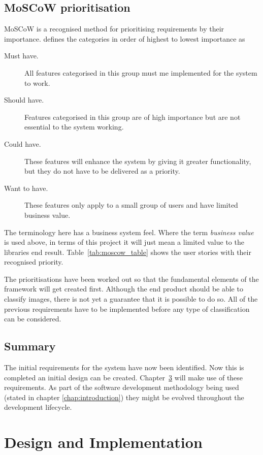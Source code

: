 \documentclass[11pt,oneside]{report}
\begin{document}
		\section{MoSCoW prioritisation}
			MoSCoW is a recognised method for prioritising requirements by their importance.  defines the categories in order of highest to lowest importance as
			\begin{description}
				\item[Must have. ] All features categorised in this group must me implemented for the system to work.
				\item[Should have. ] Features categorised in this group are of high importance but are not essential to the system working.
				\item[Could have. ] These features will enhance the system by giving it greater functionality, but they do not have to be delivered as a priority.
				\item[Want to have. ] These features only apply to a small group of users and have limited business value.
			\end{description}
			The terminology here has a business system feel.
			Where the term \textit{business value} is used above, in terms of this project it will just mean a limited value to the libraries end result.
			Table~\ref{tab:moscow_table} shows the user stories with their recognised priority.
			
			\clearpage
			The prioritisations have been worked out so that the fundamental elements of the framework will get created first.
			Although the end product should be able to classify images, there is not yet a guarantee that it is possible to do so.
			All of the previous requirements have to be implemented before any type of classification can be considered.
		\section{Summary}
			The initial requirements for the system have now been identified.
			Now this is completed an initial design can be created.
			Chapter~\ref{chap:des&imp} will make use of these requirements.
			As part of the software development methodology being used (stated in chapter \ref{chap:introduction}) they might be evolved throughout the development lifecycle.
    		
	
	\chapter{Design and Implementation}\label{chap:des&imp}
\end{document}
